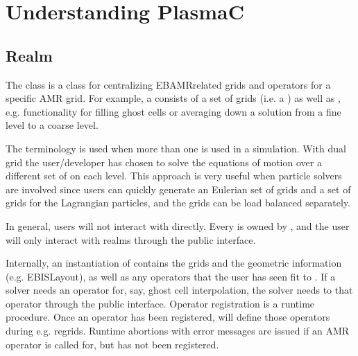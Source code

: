 \documentclass[letterpaper,10pt,english]{sphinxmanual}
\begin{document}
\chapter{Understanding PlasmaC}
\label{\detokenize{index:understanding-plasmac}}\label{\detokenize{index:chap-usingplasmac}}

\section{Realm}
\label{\detokenize{Realm:realm}}\label{\detokenize{Realm:chap-realm}}\label{\detokenize{Realm::doc}}
The  class is a class for centralizing EBAMR\sphinxhyphen{}related grids and operators for a specific AMR grid.
For example, a  consists of a set of grids (i.e. a ) as well as , e.g. functionality for filling ghost cells or averaging down a solution from a fine level to a coarse level.

The terminology  is used when more than one  is used in a simulation.
With dual grid the user/developer has chosen to solve the equations of motion over a different set of  on each level.
This approach is very useful when particle solvers are involved since users can quickly generate an Eulerian set of grids and a set of grids for the Lagrangian particles, and the grids can be load balanced separately.

In general, users will not interact with  directly.
Every  is owned by , and the user will only interact with realms through the public  interface.

Internally, an instantiation of  contains the grids and the geometric information (e.g. EBISLayout), as well as any operators that the user has seen fit to .
If a solver needs an operator for, say, ghost cell interpolation, the solver needs to  that operator through the  public interface.
Operator registration is a run\sphinxhyphen{}time procedure.
Once an operator has been registered,  will define those operators during e.g. regrids.
Run\sphinxhyphen{}time abortions with error messages are issued if an AMR operator is called for, but has not been registered.
\end{document}
